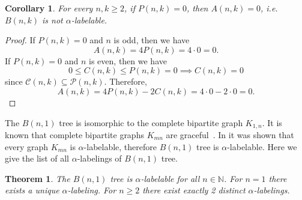 \documentclass[10pt]{article}
\newtheorem{theorem}{Theorem}
\newtheorem{corollary}{Corollary}[theorem]
\theoremstyle{definition}
\begin{document}
\begin{corollary}
  \label{cor:alpha-labeling-nonexistence}
  For every $n, k \ge 2$, if $P(n, k) = 0$, then $A(n, k) = 0$, i.e. $B(n, k)$ is not $\alpha$-labelable.
\end{corollary}

\begin{proof}
  If $P(n, k) = 0$ and $n$ is odd, then we have
  $$
  A(n, k) = 4 P(n, k) = 4 \cdot 0 = 0.
  $$
  If $P(n, k) = 0$ and $n$ is even, then we have
  $$
  0 \le C(n, k) \le P(n, k) = 0 \implies C(n, k) = 0
  $$
  since $\mathcal{C}(n, k) \subseteq \mathcal{P}(n, k)$. Therefore,
  $$
  A(n, k) = 4 P(n, k) - 2 C(n, k) = 4 \cdot 0 - 2 \cdot 0 = 0.
  $$
\end{proof}

The $B(n,1)$ tree is isomorphic to the complete bipartite graph $K_{1,n}$. It is known that complete bipartite graphs $K_{mn}$ are graceful~\cite{G72}. In \cite[Theorem 6]{R67} it was shown that every graph $K_{mn}$ is $\alpha$-labelable, therefore $B(n,1)$ tree is $\alpha$-labelable. Here we give the list of all $\alpha$-labelings of $B(n,1)$ tree.

\begin{theorem}
  \label{thm:B(n,1)}
  The $B(n, 1)$ tree is $\alpha$-labelable for all $n \in \mathbb{N}$. For $n = 1$ there exists a unique $\alpha$-labeling. For $n \geq 2$ there exist exactly 2 distinct $\alpha$-labelings.
\end{theorem}
\end{document}
